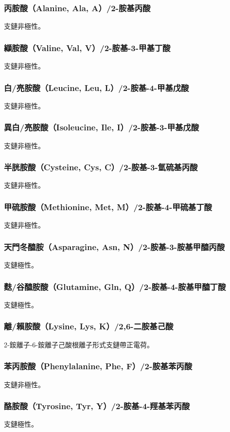 \documentclass[a4paper,12pt]{report}
\begin{document}
\begin{itemize}
\begin{itemize}
\subsubsection{丙胺酸（Alanine, Ala, A）/2-胺基丙酸}
支鏈非極性。
\subsubsection{纈胺酸（Valine, Val, V）/2-胺基-3-甲基丁酸}
支鏈非極性。
\subsubsection{白/亮胺酸（Leucine, Leu, L）/2-胺基-4-甲基戊酸}
支鏈非極性。
\subsubsection{異白/亮胺酸（Isoleucine, Ile, I）/2-胺基-3-甲基戊酸}
支鏈非極性。
\subsubsection{半胱胺酸（Cysteine, Cys, C）/2-胺基-3-氫硫基丙酸}
支鏈非極性。
\subsubsection{甲硫胺酸（Methionine, Met, M）/2-胺基-4-甲硫基丁酸}
支鏈非極性。
\subsubsection{天門冬醯胺（Asparagine, Asn, N）/2-胺基-3-胺基甲醯丙酸}
支鏈極性。
\subsubsection{麩/谷醯胺酸（Glutamine, Gln, Q）/2-胺基-4-胺基甲醯丁酸}
支鏈極性。
\subsubsection{離/賴胺酸（Lysine, Lys, K）/2,6-二胺基己酸}
2-銨離子-6-銨離子己酸根離子形式支鏈帶正電荷。
\subsubsection{苯丙胺酸（Phenylalanine, Phe, F）/2-胺基苯丙酸}
支鏈非極性。
\subsubsection{酪胺酸（Tyrosine, Tyr, Y）/2-胺基-4-羥基苯丙酸}
支鏈極性。

\end{itemize}
\end{itemize}
\end{document}
